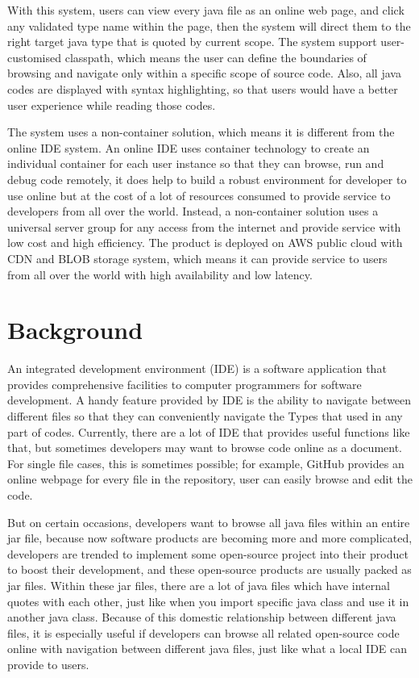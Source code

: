 \documentclass[runningheads]{llncs}
\begin{document}
With this system, users can view every java file as an online web page, and click any validated type name within the page, then the system will direct them to the right target java type that is quoted by current scope.
The system support user-customised classpath, which means the user can define the boundaries of browsing and navigate only within a specific scope of source code. Also, all java codes are displayed with syntax highlighting, so that users would have a better user experience while reading those codes.

The system uses a non-container solution, which means it is different from the online IDE system. An online IDE uses container technology to create an individual container for each user instance so that they can browse, run and debug code remotely, it does help to build a robust environment for developer to use online but at the cost of a lot of resources consumed to provide service to developers from all over the world. Instead, a non-container solution uses a universal server group for any access from the internet and provide service with low cost and high efficiency.
The product is deployed on AWS public cloud with CDN\cite{Content_delivery_network} and BLOB\cite{Binary_large_object} storage system, which means it can provide service to users from all over the world with high availability and low latency.


\section{Background}

An integrated development environment (IDE) is a software application that provides comprehensive facilities to computer programmers for software development\cite{Ide_introduction}. A handy feature provided by IDE is the ability to navigate between different files so that they can conveniently navigate the Types that used in any part of codes. Currently, there are a lot of IDE that provides useful functions like that, but sometimes developers may want to browse code online as a document. For single file cases, this is sometimes possible; for example, GitHub\cite{GitHub} provides an online webpage for every file in the repository, user can easily browse and edit the code. 

But on certain occasions, developers want to browse all java files within an entire jar file, because now software products are becoming more and more complicated, developers are trended to implement some open-source project into their product to boost their development, and these open-source products are usually packed as jar files. Within these jar files, there are a lot of java files which have internal quotes with each other, just like when you import specific java class and use it in another java class. Because of this domestic relationship between different java files, it is especially useful if developers can browse all related open-source code online with navigation between different java files, just like what a local IDE can provide to users.
\end{document}
